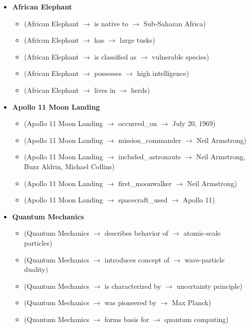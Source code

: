 \documentclass[11pt]{article}
\begin{document}
\begin{itemize}[leftmargin=*]  %
\item \textbf{African Elephant}
  \begin{itemize}[leftmargin=1em]
  \item (African Elephant $\rightarrow$ is native to $\rightarrow$ Sub-Saharan Africa)
  \item (African Elephant $\rightarrow$ has $\rightarrow$ large tusks)
  \item (African Elephant $\rightarrow$ is classified as $\rightarrow$ vulnerable species)
  \item (African Elephant $\rightarrow$ possesses $\rightarrow$ high intelligence)
  \item (African Elephant $\rightarrow$ lives in $\rightarrow$ herds)
  \end{itemize}

\item \textbf{Apollo 11 Moon Landing}
  \begin{itemize}[leftmargin=1em]
  \item (Apollo 11 Moon Landing $\rightarrow$ occurred\_on $\rightarrow$ July 20, 1969)
  \item (Apollo 11 Moon Landing $\rightarrow$ mission\_commander $\rightarrow$ Neil Armstrong)
  \item (Apollo 11 Moon Landing $\rightarrow$ included\_astronauts $\rightarrow$ Neil Armstrong, Buzz Aldrin, Michael Collins)
  \item (Apollo 11 Moon Landing $\rightarrow$ first\_moonwalker $\rightarrow$ Neil Armstrong)
  \item (Apollo 11 Moon Landing $\rightarrow$ spacecraft\_used $\rightarrow$ Apollo 11)
  \end{itemize}

\item \textbf{Quantum Mechanics}
  \begin{itemize}[leftmargin=1em]
  \item (Quantum Mechanics $\rightarrow$ describes behavior of $\rightarrow$ atomic-scale particles)
  \item (Quantum Mechanics $\rightarrow$ introduces concept of $\rightarrow$ wave-particle duality)
  \item (Quantum Mechanics $\rightarrow$ is characterized by $\rightarrow$ uncertainty principle)
  \item (Quantum Mechanics $\rightarrow$ was pioneered by $\rightarrow$ Max Planck)
  \item (Quantum Mechanics $\rightarrow$ forms basis for $\rightarrow$ quantum computing)
  \end{itemize}


\end{itemize}
\end{document}
